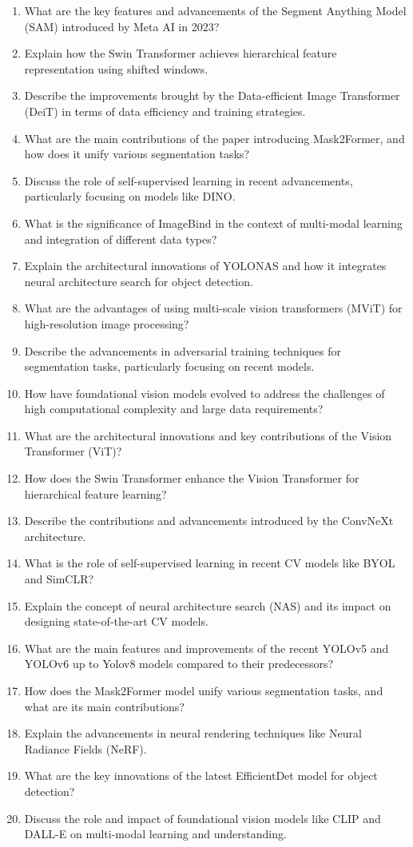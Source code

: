 \documentclass[12pt]{article}
\begin{document}
\begin{enumerate}
    \item What are the key features and advancements of the Segment Anything Model (SAM) introduced by Meta AI in 2023?
    \item Explain how the Swin Transformer achieves hierarchical feature representation using shifted windows.
    \item Describe the improvements brought by the Data-efficient Image Transformer (DeiT) in terms of data efficiency and training strategies.
    \item What are the main contributions of the paper introducing Mask2Former, and how does it unify various segmentation tasks?
    \item Discuss the role of self-supervised learning in recent advancements, particularly focusing on models like DINO.
    \item What is the significance of ImageBind in the context of multi-modal learning and integration of different data types?
    \item Explain the architectural innovations of YOLONAS and how it integrates neural architecture search for object detection.
    \item What are the advantages of using multi-scale vision transformers (MViT) for high-resolution image processing?
    \item Describe the advancements in adversarial training techniques for segmentation tasks, particularly focusing on recent models.
    \item How have foundational vision models evolved to address the challenges of high computational complexity and large data requirements?
    \item What are the architectural innovations and key contributions of the Vision Transformer (ViT)?
    \item How does the Swin Transformer enhance the Vision Transformer for hierarchical feature learning?
    \item Describe the contributions and advancements introduced by the ConvNeXt architecture.
    \item What is the role of self-supervised learning in recent CV models like BYOL and SimCLR?
    \item Explain the concept of neural architecture search (NAS) and its impact on designing state-of-the-art CV models.
    \item What are the main features and improvements of the recent YOLOv5 and YOLOv6 up to Yolov8 models compared to their predecessors?
    \item How does the Mask2Former model unify various segmentation tasks, and what are its main contributions?
    \item Explain the advancements in neural rendering techniques like Neural Radiance Fields (NeRF).
    \item What are the key innovations of the latest EfficientDet model for object detection?
    \item Discuss the role and impact of foundational vision models like CLIP and DALL-E on multi-modal learning and understanding.
\end{enumerate}
\end{document}
